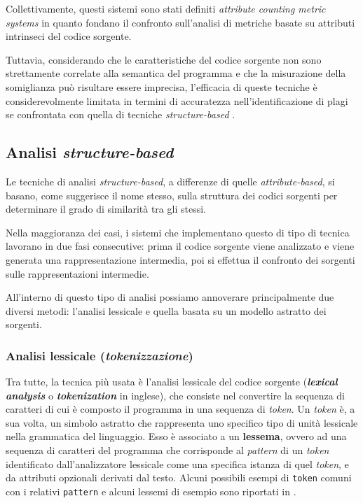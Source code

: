 Collettivamente, questi sistemi sono stati definiti \textit{attribute counting metric systems} in quanto fondano il confronto sull'analisi di metriche basate su attributi intrinseci del codice sorgente.

Tuttavia, considerando che le caratteristiche del codice sorgente non sono strettamente correlate alla semantica del programma e che la misurazione della somiglianza può risultare essere imprecisa, l'efficacia di queste tecniche è considerevolmente limitata in termini di accuratezza nell'identificazione di plagi se confrontata con quella di tecniche \textit{structure-based} \cite{es-plag}.

\subsection{Analisi \textit{structure-based}}
Le tecniche di analisi \textit{structure-based}, a differenze di quelle \textit{attribute-based}, si basano, come suggerisce il nome stesso, sulla struttura dei codici sorgenti per determinare il grado di similarità tra gli stessi.

Nella maggioranza dei casi, i sistemi che implementano questo di tipo di tecnica lavorano in due fasi consecutive: prima il codice sorgente viene analizzato e viene generata una rappresentazione intermedia, poi si effettua il confronto dei sorgenti sulle rappresentazioni intermedie.

All'interno di questo tipo di analisi possiamo annoverare principalmente due diversi metodi: l'analisi lessicale e quella basata su un modello astratto dei sorgenti.

\subsubsection{Analisi lessicale (\textit{tokenizzazione})}
Tra tutte, la tecnica più usata è l'analisi lessicale del codice sorgente (\textbf{\textit{lexical analysis}} o \textbf{\textit{tokenization}} in inglese), che consiste nel convertire la sequenza di caratteri di cui è composto il programma in una sequenza di \textit{token}.
%
Un \textit{token} è, a sua volta, un simbolo astratto che rappresenta uno specifico tipo di unità lessicale nella grammatica del linguaggio. 
%
Esso è associato a un \textbf{lessema}, ovvero ad una sequenza di caratteri del programma che corrisponde al \textit{pattern} di un \textit{token} identificato dall'analizzatore lessicale come una specifica istanza di quel \textit{token}, e da attributi opzionali derivati dal testo.
%
Alcuni possibili esempi di \texttt{token} comuni con i relativi \texttt{pattern} e alcuni lessemi di esempio sono riportati in .

